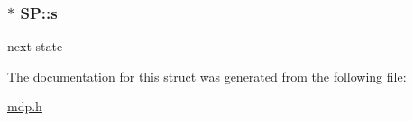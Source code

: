 \subsubsection[{\texorpdfstring{s}{s}}]{$\ast$ S\+P\+::s}\hypertarget{structSP_a8bf41ff3d3a30c4f6f078507c176f85f}{}\label{structSP_a8bf41ff3d3a30c4f6f078507c176f85f}
next state 

The documentation for this struct was generated from the following file\+:\begin{DoxyCompactItemize}
\item 
\hyperlink{mdp_8h}{mdp.\+h}\end{DoxyCompactItemize}
